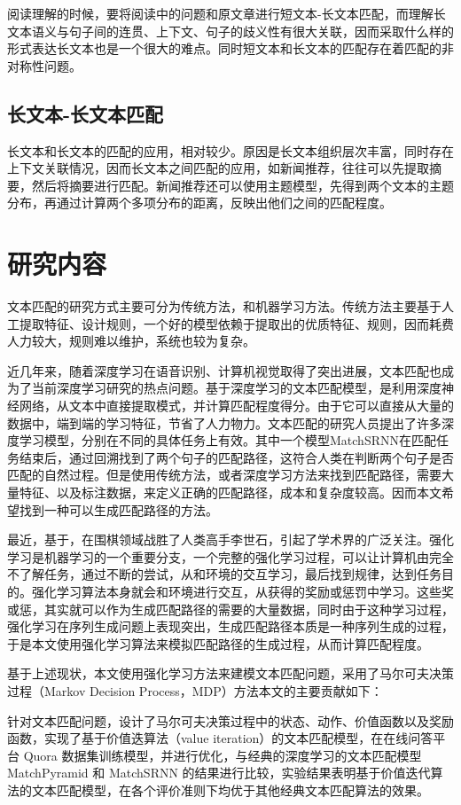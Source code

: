 阅读理解的时候，要将阅读中的问题和原文章进行短文本-长文本匹配，而理解长文本语义与句子间的连贯、上下文、句子的歧义性有很大关联，因而采取什么样的形式表达长文本也是一个很大的难点。同时短文本和长文本的匹配存在着匹配的非对称性问题。

\subsection{长文本-长文本匹配}
长文本和长文本的匹配的应用，相对较少。原因是长文本组织层次丰富，同时存在上下文关联情况，因而长文本之间匹配的应用，如新闻推荐，往往可以先提取摘要，然后将摘要进行匹配。新闻推荐还可以使用主题模型，先得到两个文本的主题分布，再通过计算两个多项分布的距离，反映出他们之间的匹配程度。

\section{研究内容}

文本匹配的研究方式主要可分为传统方法，和机器学习方法。传统方法主要基于人工提取特征、设计规则，一个好的模型依赖于提取出的优质特征、规则，因而耗费人力较大，规则难以维护，系统也较为复杂。

近几年来，随着深度学习在语音识别、计算机视觉取得了突出进展，文本匹配也成为了当前深度学习研究的热点问题。基于深度学习的文本匹配模型，是利用深度神经网络，从文本中直接提取模式，并计算匹配程度得分。由于它可以直接从大量的数据中，端到端的学习特征，节省了人力物力。文本匹配的研究人员提出了许多深度学习模型，分别在不同的具体任务上有效。其中一个模型MatchSRNN在匹配任务结束后，通过回溯找到了两个句子的匹配路径，这符合人类在判断两个句子是否匹配的自然过程。但是使用传统方法，或者深度学习方法来找到匹配路径，需要大量特征、以及标注数据，来定义正确的匹配路径，成本和复杂度较高。因而本文希望找到一种可以生成匹配路径的方法。

最近，基于，在围棋领域战胜了人类高手李世石，引起了学术界的广泛关注。强化学习是机器学习的一个重要分支，一个完整的强化学习过程，可以让计算机由完全不了解任务，通过不断的尝试，从和环境的交互学习，最后找到规律，达到任务目的。强化学习算法本身就会和环境进行交互，从获得的奖励或惩罚中学习。这些奖或惩，其实就可以作为生成匹配路径的需要的大量数据，同时由于这种学习过程，强化学习在序列生成问题上表现突出，生成匹配路径本质是一种序列生成的过程，于是本文使用强化学习算法来模拟匹配路径的生成过程，从而计算匹配程度。

基于上述现状，本文使用强化学习方法来建模文本匹配问题，采用了马尔可夫决策过程（Markov Decision Process，MDP）方法本文的主要贡献如下：

针对文本匹配问题，设计了马尔可夫决策过程中的状态、动作、价值函数以及奖励函数，实现了基于价值迭算法（value iteration）的文本匹配模型，在在线问答平台 Quora 数据集训练模型，并进行优化，与经典的深度学习的文本匹配模型MatchPyramid 和 MatchSRNN 的结果进行比较，实验结果表明基于价值迭代算法的文本匹配模型，在各个评价准则下均优于其他经典文本匹配算法的效果。


